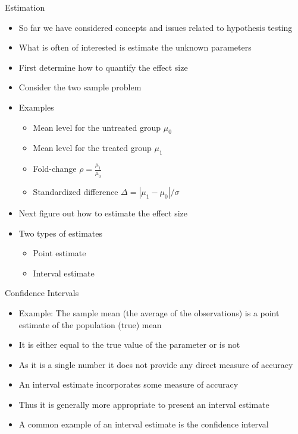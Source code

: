 \documentclass[xcolor=x11names,compress]{beamer}\usepackage[]{graphicx}\usepackage[]{color}
\begin{document}
\begin{frame}{Estimation}
  \begin{itemize}
  \item So far we have considered concepts and issues related to hypothesis testing
  \item What is often of interested is estimate the unknown parameters
  \item First determine how to quantify the effect size
  \item Consider the two sample problem
  \item Examples
    \begin{itemize}
    \item Mean level for the untreated group $\mu_0$
    \item Mean level for the treated group $\mu_1$
    \item Fold-change $\rho=\frac{\mu_1}{\mu_0}$
    \item Standardized difference $\Delta=|\mu_1-\mu_0|/\sigma$
  \end{itemize}
  \item Next figure out how to estimate the effect size
  \item Two types of estimates
    \begin{itemize}
    \item Point estimate
    \item Interval estimate
    \end{itemize}
  \end{itemize}
\end{frame}


\begin{frame}{Confidence Intervals}
  \begin{itemize}
  \item Example: The sample mean (the average of the observations) is a point estimate of the 
        population (true) mean
  \item It is either equal to the true value of the parameter or is not
  \item As it is a single number it does not provide any direct measure of accuracy
  \item An interval estimate incorporates some measure of accuracy
  \item Thus it is generally more appropriate to present an interval estimate
  \item A common example of an interval estimate is the confidence interval
  \end{itemize}
\end{frame}
\end{document}
